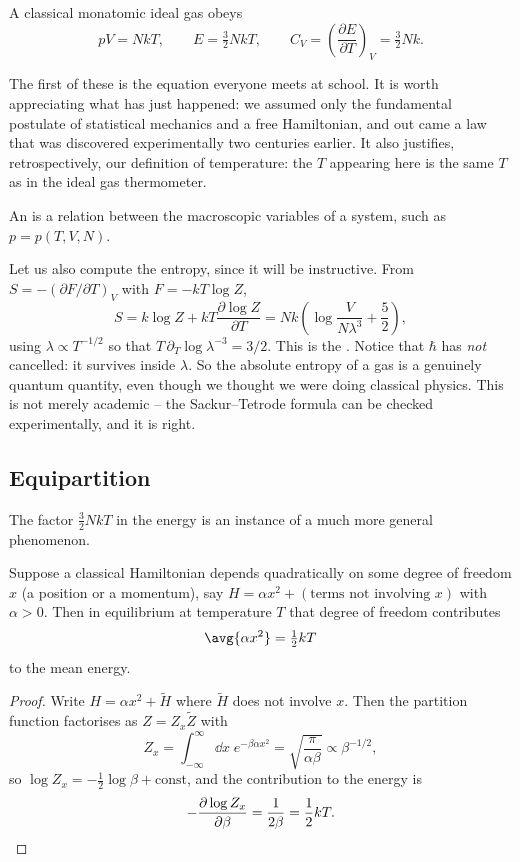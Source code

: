 \begin{proposition}
	A classical monatomic ideal gas obeys
	$$
	pV = NkT, \qquad E = \tfrac 32 NkT, \qquad C_V = \left(\frac{\partial E}{\partial T}\right)_V = \tfrac 32 Nk.
	$$
\end{proposition}

The first of these is the equation everyone meets at school. It is worth appreciating what has just happened: we assumed only the fundamental postulate of statistical mechanics and a free Hamiltonian, and out came a law that was discovered experimentally two centuries earlier. It also justifies, retrospectively, our definition of temperature: the $T$ appearing here is the same $T$ as in the ideal gas thermometer.

\begin{definition}
	An  is a relation between the macroscopic variables of a system, such as $p = p(T,V,N)$.
\end{definition}

Let us also compute the entropy, since it will be instructive. From $S = -(\partial F/\partial T)_V$ with $F = -kT\log Z$,
$$
S = k\log Z + kT \frac{\partial \log Z}{\partial T} = Nk\left(\log\frac{V}{N\lambda^3} + \frac 52\right),
$$
using $\lambda \propto T^{-1/2}$ so that $T\,\partial_T \log \lambda^{-3} = 3/2$. This is the . Notice that $\hbar$ has \emph{not} cancelled: it survives inside $\lambda$. So the absolute entropy of a gas is a genuinely quantum quantity, even though we thought we were doing classical physics. This is not merely academic -- the Sackur--Tetrode formula can be checked experimentally, and it is right.

\subsection{Equipartition}

The factor $\tfrac 32 NkT$ in the energy is an instance of a much more general phenomenon.

\begin{proposition}
	Suppose a classical Hamiltonian depends quadratically on some degree of freedom $x$ (a position or a momentum), say $H = \alpha x^2 + (\text{terms not involving } x)$ with $\alpha > 0$. Then in equilibrium at temperature $T$ that degree of freedom contributes
	$$
	\avg{\alpha x^2} = \tfrac 12 kT
	$$
	to the mean energy.
\end{proposition}
\begin{proof}
	Write $H = \alpha x^2 + \tilde H$ where $\tilde H$ does not involve $x$. Then the partition function factorises as $Z = Z_x \tilde Z$ with
	$$
	Z_x = \int_{-\infty}^\infty \dd x \; e^{-\beta\alpha x^2} = \sqrt{\frac{\pi}{\alpha\beta}} \propto \beta^{-1/2},
	$$
	so $\log Z_x = -\tfrac 12 \log\beta + \text{const}$, and the contribution to the energy is
	$$
	-\frac{\partial \log Z_x}{\partial \beta} = \frac{1}{2\beta} = \frac 12 kT. \qedhere
	$$
\end{proof}

